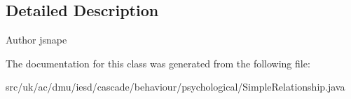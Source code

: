 \subsection{Detailed Description}
\begin{DoxyAuthor}{Author}
jsnape 
\end{DoxyAuthor}


The documentation for this class was generated from the following file\-:\begin{DoxyCompactItemize}
\item 
src/uk/ac/dmu/iesd/cascade/behaviour/psychological/Simple\-Relationship.\-java\end{DoxyCompactItemize}
